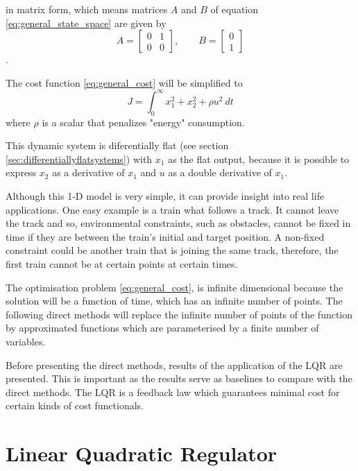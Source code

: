 in matrix form, which means matrices $A$ and $B$ of equation \ref{eq:general_state_space} are given by
\begin{equation}
    A = \begin{bmatrix} 0 & 1 \\ 0 & 0 \end{bmatrix}, \qquad B = \begin{bmatrix} 0 \\ 1 \end{bmatrix}
    \label{eq:A_and_B}
\end{equation}.

\par The cost function \ref{eq:general_cost} will be simplified to
\begin{equation}
    J = \int_0^\infty x_1^2 + x_2^2 + \rho u^2\  dt
    \label{eq:my_cost}
\end{equation}
where $\rho$ is a scalar that penalizes "energy" consumption.
\par This dynamic system is diferentially flat (see section \ref{sec:differentiallyflatsystems}) with $x_1$ as the flat output, because it is possible to express $x_2$ as a derivative of $x_1$ and $u$ as a double derivative of $x_1$.
\par Although this 1-D model is very simple, it can provide insight into real life applications. One easy example is a train what follows a track. It cannot leave the track and so, environmental constraints, such as obstacles, cannot be fixed in time if they are between the train's initial and target position. A non-fixed constraint could be another train that is joining the same track, therefore, the first train cannot be at certain points at certain times.
\par The optimisation problem \eqref{eq:general_cost}, is infinite dimensional because the solution will be a function of time, which has an infinite number of points. The following direct methods will replace the infinite number of points of the function by approximated functions which are parameterised by a finite number of variables.
\par Before presenting the direct methods, results of the application of the \acl{LQR} are presented. This is important as the results serve as baselines to compare with the direct methods. The \ac{LQR} is a feedback law which guarantees minimal cost for certain kinds of cost functionals.

\section{Linear Quadratic Regulator}
\label{sec:linearquadraticregulator}

